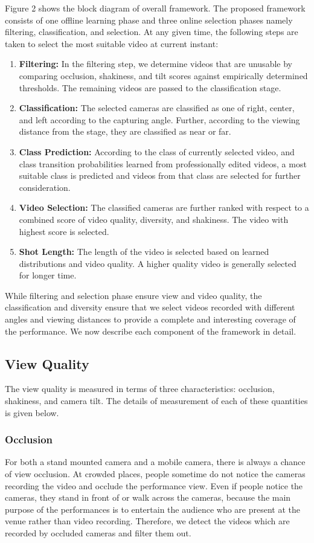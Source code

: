 \documentclass{sig-alternate}
\begin{document}
Figure 2 shows the block diagram of overall framework. The
proposed framework consists of one offline learning phase and three online selection phases namely filtering, classification, and selection.
At any given time, the following steps are taken to select the
most suitable video at current instant:

\begin{enumerate}
\item \textbf{Filtering: }In the filtering step, we determine videos that are
unusable by comparing occlusion, shakiness, and tilt scores
against empirically determined thresholds. The remaining
videos are passed to the classification stage.
\item \textbf{Classification: }The selected cameras are classified as one
of right, center, and left according to the capturing angle.
Further, according to the viewing distance from the stage,
they are classified as near or far.
\item \textbf{Class Prediction: }According to the class of currently selected
video, and class transition probabilities learned from
professionally edited videos, a most suitable class is predicted
and videos from that class are selected for further consideration.
\item \textbf{Video Selection: }The classified cameras are further ranked
with respect to a combined score of video quality, diversity,
and shakiness. The video with highest score is selected.
\item \textbf{Shot Length: }The length of the video is selected based on
learned distributions and video quality. A higher quality video
is generally selected for longer time.
\end{enumerate}

While filtering and selection phase ensure view and video quality,
the classification and diversity ensure that we select videos
recorded with different angles and viewing distances to provide a
complete and interesting coverage of the performance. We now
describe each component of the framework in detail.

\subsection{View Quality}
The view quality is measured in terms of three characteristics:
occlusion, shakiness, and camera tilt. The details of measurement
of each of these quantities is given below.

\subsubsection{Occlusion}
For both a stand mounted camera and a mobile camera, there
is always a chance of view occlusion. At crowded places, people sometime do not notice the cameras recording the video and occlude the performance view. Even if people notice the cameras, they stand in front of or walk across the cameras, because the main purpose of the performances is to entertain the audience who are present at the venue rather than video recording. Therefore, we detect the videos which are recorded by occluded cameras and filter
them out.
\end{document}
